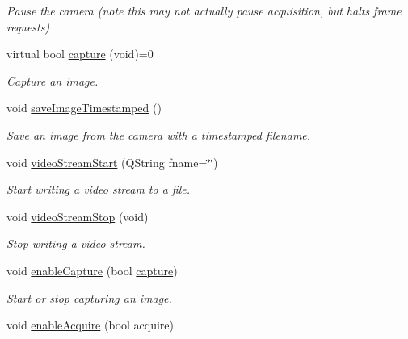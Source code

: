 \begin{DoxyCompactItemize}
\begin{DoxyCompactList}\small\item\em Pause the camera (note this may not actually pause acquisition, but halts frame requests) \end{DoxyCompactList}\item 
virtual bool \hyperlink{class_abstract_stereo_camera_a01d0ecf3cf4bb8e9a6b9e34292483d14}{capture} (void)=0
\begin{DoxyCompactList}\small\item\em Capture an image. \end{DoxyCompactList}\item 
void \hyperlink{class_abstract_stereo_camera_ac299030bbbc8a7445140ca419c94a558}{save\+Image\+Timestamped} ()
\begin{DoxyCompactList}\small\item\em Save an image from the camera with a timestamped filename. \end{DoxyCompactList}\item 
void \hyperlink{class_abstract_stereo_camera_af58b04dd9c17e4d5cc139eb99d738cc6}{video\+Stream\+Start} (Q\+String fname=\char`\"{}\char`\"{})
\begin{DoxyCompactList}\small\item\em Start writing a video stream to a file. \end{DoxyCompactList}\item 
void \hyperlink{class_abstract_stereo_camera_ae39e6f45c68b4bbd4442fdac161051bd}{video\+Stream\+Stop} (void)
\begin{DoxyCompactList}\small\item\em Stop writing a video stream. \end{DoxyCompactList}\item 
\hypertarget{class_abstract_stereo_camera_a1b8bc87de9f73731b0ca1c9b293b57ac}{}void \hyperlink{class_abstract_stereo_camera_a1b8bc87de9f73731b0ca1c9b293b57ac}{enable\+Capture} (bool \hyperlink{class_abstract_stereo_camera_a01d0ecf3cf4bb8e9a6b9e34292483d14}{capture})\label{class_abstract_stereo_camera_a1b8bc87de9f73731b0ca1c9b293b57ac}

\begin{DoxyCompactList}\small\item\em Start or stop capturing an image. \end{DoxyCompactList}\item 
\hypertarget{class_abstract_stereo_camera_aa8bd29dcb39ee696e675087d0c119339}{}void \hyperlink{class_abstract_stereo_camera_aa8bd29dcb39ee696e675087d0c119339}{enable\+Acquire} (bool acquire)\label{class_abstract_stereo_camera_aa8bd29dcb39ee696e675087d0c119339}


\end{DoxyCompactItemize}

